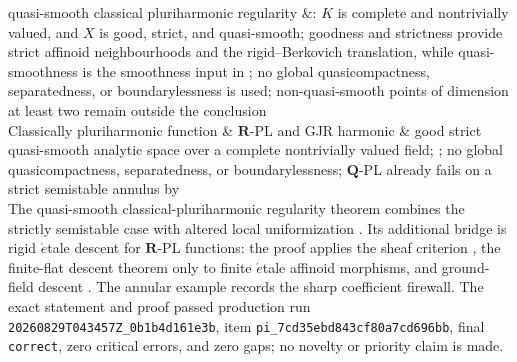 
quasi-smooth classical pluriharmonic regularity
 &: \(K\) is complete and nontrivially
  valued, and \(X\) is good, strict, and quasi-smooth; goodness and strictness
  provide strict affinoid neighbourhoods and the rigid--Berkovich
  translation, while quasi-smoothness is the smoothness input in
  \cite[Corollary~3.3.2]{Temkin17}; no global quasicompactness,
  separatedness, or boundarylessness is used; non-quasi-smooth points of
  dimension at least two remain outside the conclusion\\

Classically pluriharmonic function & \(\mathbf R\)-PL and GJR harmonic &
good strict quasi-smooth analytic space over a complete nontrivially valued
field; ; no global quasicompactness,
separatedness, or boundarylessness; \(\mathbf Q\)-PL already fails on a
strict semistable annulus by
 \\

The quasi-smooth classical-pluriharmonic regularity theorem
 combines the strictly semistable case
\cite[Proposition~7.8]{GR25Classical} with altered local uniformization
\cite[Corollary~3.3.2]{Temkin17}.  Its additional bridge is rigid
\(\acute{e}\)tale descent for \(\mathbf R\)-PL functions: the proof applies
the sheaf criterion \cite[Proposition~3.2.2]{dJvdP96}, the finite-flat
descent theorem \cite[Proposition~5.11]{GJR26} only to finite
\(\acute{e}\)tale affinoid morphisms, and ground-field descent
\cite[Corollary~5.12]{GJR26}.  The annular example
 records the sharp coefficient
  firewall.  The exact statement and proof passed production run
  \nolinkurl{20260829T043457Z_0b1b4d161e3b}, item
  \nolinkurl{pi_7cd35ebd843cf80a7cd696bb}, final \texttt{correct}, zero
  critical errors, and zero gaps; no novelty or priority claim is made.
